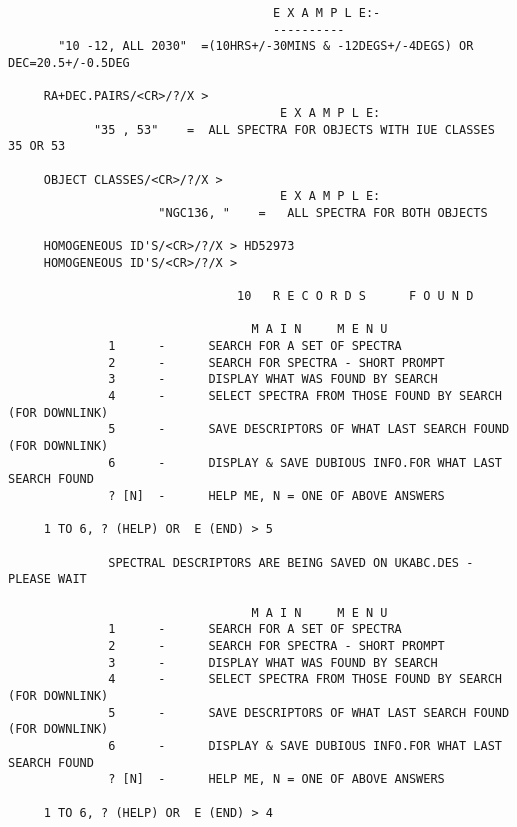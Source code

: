 \begin{footnotesize}
\begin{verbatim}
                                     E X A M P L E:-                                 
                                     ----------                                  
       "10 -12, ALL 2030"  =(10HRS+/-30MINS & -12DEGS+/-4DEGS) OR DEC=20.5+/-0.5DEG  
     
     RA+DEC.PAIRS/<CR>/?/X >
                                      E X A M P L E:                                 
            "35 , 53"    =  ALL SPECTRA FOR OBJECTS WITH IUE CLASSES 35 OR 53        

     OBJECT CLASSES/<CR>/?/X >
                                      E X A M P L E:                                 
                     "NGC136, "    =   ALL SPECTRA FOR BOTH OBJECTS                 

     HOMOGENEOUS ID'S/<CR>/?/X > HD52973
     HOMOGENEOUS ID'S/<CR>/?/X >

                                10   R E C O R D S      F O U N D
 
                                  M A I N     M E N U
              1      -      SEARCH FOR A SET OF SPECTRA
              2      -      SEARCH FOR SPECTRA - SHORT PROMPT
              3      -      DISPLAY WHAT WAS FOUND BY SEARCH
              4      -      SELECT SPECTRA FROM THOSE FOUND BY SEARCH (FOR DOWNLINK)
              5      -      SAVE DESCRIPTORS OF WHAT LAST SEARCH FOUND (FOR DOWNLINK)
              6      -      DISPLAY & SAVE DUBIOUS INFO.FOR WHAT LAST SEARCH FOUND
              ? [N]  -      HELP ME, N = ONE OF ABOVE ANSWERS
 
     1 TO 6, ? (HELP) OR  E (END) > 5

              SPECTRAL DESCRIPTORS ARE BEING SAVED ON UKABC.DES - PLEASE WAIT         

                                  M A I N     M E N U
              1      -      SEARCH FOR A SET OF SPECTRA
              2      -      SEARCH FOR SPECTRA - SHORT PROMPT
              3      -      DISPLAY WHAT WAS FOUND BY SEARCH
              4      -      SELECT SPECTRA FROM THOSE FOUND BY SEARCH (FOR DOWNLINK)
              5      -      SAVE DESCRIPTORS OF WHAT LAST SEARCH FOUND (FOR DOWNLINK)
              6      -      DISPLAY & SAVE DUBIOUS INFO.FOR WHAT LAST SEARCH FOUND
              ? [N]  -      HELP ME, N = ONE OF ABOVE ANSWERS

     1 TO 6, ? (HELP) OR  E (END) > 4


\end{verbatim}
\end{footnotesize}
